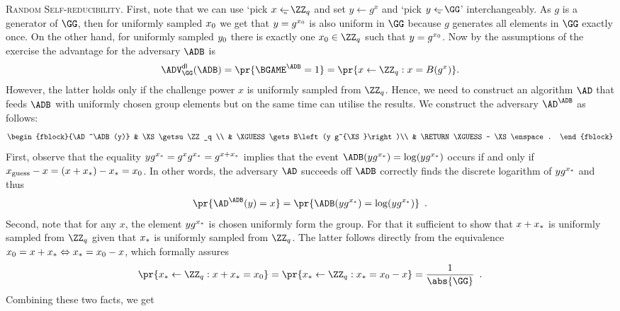 \documentclass{crypto-exercise}
\begin{document}
\begin{solution}
\textsc{Random Self-reducibility.}
First, note that we can use `pick $x \getsu \ZZ_q$ and set $y\gets g^x$ and `pick $y \getsu \GG$' interchangeably. As $g$ is a generator of $\GG$, then for uniformly sampled $x_{0}$ we get that $y = g^{x_{0}}$ is also uniform in $\GG$ because $g$ generates all elements in $\GG$ exactly once. On the other hand, for uniformly sampled $y_{0}$ there is exactly one $\XZ \in \ZZ_q$ such that $y = g^{x_{0}}$. Now by the assumptions of the exercise the advantage for the adversary $\ADB$ is
  \begin{align}
  \ADVDL{\GG}{\ADB} = \pr{\BGAME^\ADB=1} = \pr{x\gets \ZZ_q: x=B(g^x)}
  \label{adv_b}.
\end{align}
However, the latter holds only if the challenge power $x$ is uniformly sampled from $\ZZ_q$. Hence, we need to construct an algorithm $\AD$ that feeds $\ADB$ with uniformly chosen group elements but on the same time can utilise the results. We construct the adversary $\AD^\ADB$ as follows:
  \begin{align*}
    \begin{fblock}{\AD^\ADB(y)}
    & \XS \getsu \ZZ_q \\
    & \XGUESS \gets B\left(y g^{\XS}\right)\\
    & \RETURN \XGUESS - \XS \enspace .
    \end{fblock} 
  \end{align*}
First, observe that the  equality  $y g^{x_{*}} = g^{x} g^{x_{*}} = g^{x + x_{*}}$ implies that the event $\ADB(y g^{\XS})=\log (y g^{\XS})$ occurs if and only if $x_{\text{guess}} - x = (x + x_{*}) - x_{*} = x_{0}$. In other words,  the adversary $\AD$ succeeds off $\ADB$ correctly finds the discrete logarithm of $y g^{x_{*}}$ and thus
\begin{align*}
\pr{\AD^{\ADB}(y)=x}=\pr{\ADB(yg^{\XS})=\log (y g^{\XS})}\enspace.
\end{align*}
Second, note that for any $x$, the element $yg^{x_{*}}$ is chosen uniformly form the group. For that it sufficient to show that $x + x_{*}$ is uniformly sampled from $\ZZ_q$ given that $x_{*}$ is uniformly sampled from $\ZZ_q$. The latter follows directly from the equivalence $x_0=x+x_{*} \Leftrightarrow  x_{*}=x_0-x$,  
which formally assures
\begin{align*}
   \pr{\XS\gets\ZZ_q:x + \XS=x_0} = \pr{\XS\gets\ZZ_q:\XS=x_0-x}=\frac{1}{\abs{\GG}}\enspace.
\end{align*}
Combining these two facts, we get 
\begin{align*}

\end{align*}
\end{solution}
\end{document}
